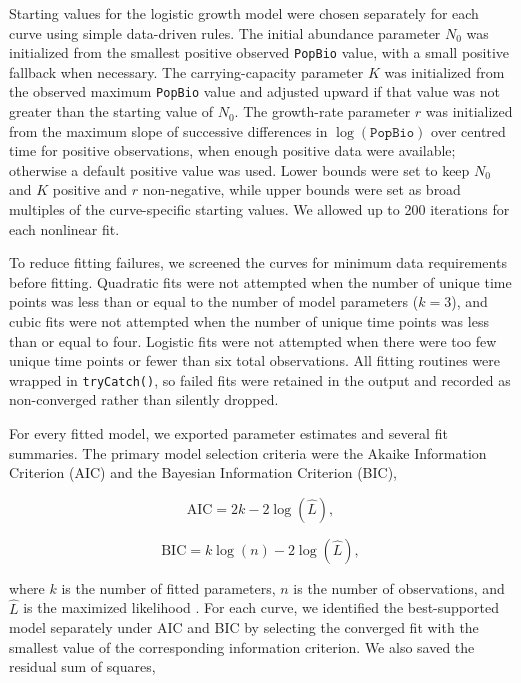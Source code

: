 \documentclass[11pt]{article}
\begin{document}
Starting values for the logistic growth model were chosen separately for each curve using simple data-driven rules. The initial abundance parameter $N_0$ was initialized from the smallest positive observed \texttt{PopBio} value, with a small positive fallback when necessary. The carrying-capacity parameter $K$ was initialized from the observed maximum \texttt{PopBio} value and adjusted upward if that value was not greater than the starting value of $N_0$. The growth-rate parameter $r$ was initialized from the maximum slope of successive differences in $\log(\texttt{PopBio})$ over centred time for positive observations, when enough positive data were available; otherwise a default positive value was used. Lower bounds were set to keep $N_0$ and $K$ positive and $r$ non-negative, while upper bounds were set as broad multiples of the curve-specific starting values. We allowed up to 200 iterations for each nonlinear fit.

To reduce fitting failures, we screened the curves for minimum data requirements before fitting. Quadratic fits were not attempted when the number of unique time points was less than or equal to the number of model parameters ($k=3$), and cubic fits were not attempted when the number of unique time points was less than or equal to four. Logistic fits were not attempted when there were too few unique time points or fewer than six total observations. All fitting routines were wrapped in \texttt{tryCatch()}, so failed fits were retained in the output and recorded as non-converged rather than silently dropped.

For every fitted model, we exported parameter estimates and several fit summaries. The primary model selection criteria were the Akaike Information Criterion (AIC) and the Bayesian Information Criterion (BIC),

\begin{equation}
\mathrm{AIC} = 2k - 2\log(\hat{L}),
\label{eq:aic}
\end{equation}

\begin{equation}
\mathrm{BIC} = k \log(n) - 2\log(\hat{L}),
\label{eq:bic}
\end{equation}

where $k$ is the number of fitted parameters, $n$ is the number of observations, and $\hat{L}$ is the maximized likelihood \citep{JohnsonOmland2004}. For each curve, we identified the best-supported model separately under AIC and BIC by selecting the converged fit with the smallest value of the corresponding information criterion. We also saved the residual sum of squares,
\end{document}
